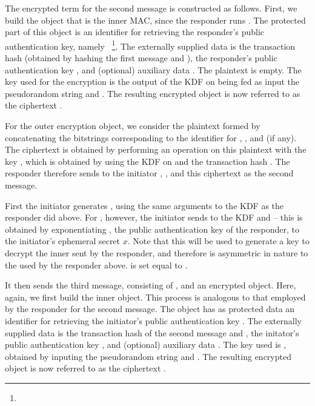 {The encrypted term for the second message is constructed as follows. First, we build the \mCose{} object that is the inner MAC, since the responder runs \mStat. The protected part of this object is an identifier for retrieving the responder's public authentication key, namely \mIdcredr~\footnote{}. The externally supplied data is the transaction hash \mTHtwo (obtained by hashing the first message and \mGy),  the responder's public authentication key \mCredr, and (optional) auxiliary data \mADtwo. The plaintext is empty. The key used for the encryption \mKtwom is the output of the KDF on being fed as input the pseudorandom string \mPRKthree and \mTHtwo. The resulting encrypted object is now referred to as the ciphertext \mMactwo. 

For the outer encryption object, we consider the plaintext formed by concatenating the bitstrings corresponding to the identifier for \mCredr, \mMactwo, and \mADtwo (if any). The ciphertext is obtained by performing an \mXor{} operation on this plaintext with the key \mKtwoe, which is obtained by using the KDF on \mPRKtwo and the transaction hash \mTHtwo. The responder therefore sends to the initiator \mGy, \mCr, and this ciphertext as the second message.

First the initiator generates \mPRKtwo, using the same arguments to the KDF as the responder did above. For \mPRKthree, however, the initiator sends to the KDF \mPRKtwo and \mGrx -- this \mGrx is obtained by exponentiating \mCredr, the public authentication key of the responder, to the initiator's ephemeral secret $x$. Note that this will be used to generate a key to decrypt the inner \mMactwo sent by the responder, and therefore is asymmetric in nature to the \mGrx used by the responder above. \mPRKfour is set equal to \mPRKthree. 

It then sends the third message, consisting of \mCr, and an encrypted object. Here, again, we first build the inner \mCose{} object. This process is analogous to that employed by the responder for the second message. The \mCose{} object has as protected data an identifier for retrieving the initiator's public authentication key \mCredi. The externally supplied data is the transaction hash \mTHthree of the second message and \mTHtwo,  the initator's public authentication key \mCredi, and (optional) auxiliary data \mADthree. The key used is \mKthreem, obtained by inputing the pseudorandom string \mPRKthree and \mTHthree. The resulting encrypted object is now referred to as the ciphertext \mMacthree. 

}
